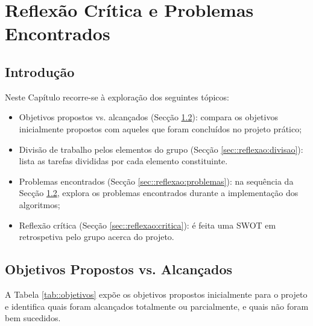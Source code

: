 \chapter{Reflexão Crítica e Problemas Encontrados}
\label{ch::reflexao}

\section{Introdução}
\label{sec::reflexao:intro}

Neste Capítulo recorre-se à exploração dos seguintes tópicos:

\begin{itemize}
	\item Objetivos propostos vs. alcançados (Secção \ref{sec::reflexao:objetivos}): compara os objetivos inicialmente propostos com aqueles que foram concluídos no projeto prático;
	\item Divisão de trabalho pelos elementos do grupo (Secção \ref{sec::reflexao:divisao}): lista as tarefas divididas por cada elemento constituinte.
	\item Problemas encontrados (Secção \ref{sec::reflexao:problemas}): na sequência da Secção \ref{sec::reflexao:objetivos}, explora os problemas encontrados durante a implementação dos algoritmos;
	\item Reflexão crítica (Secção \ref{sec::reflexao:critica}): é feita uma \ac{SWOT} em retrospetiva pelo grupo acerca do projeto.
\end{itemize}

\section{Objetivos Propostos vs. Alcançados}
\label{sec::reflexao:objetivos}

A Tabela \ref{tab::objetivos} expõe os objetivos propostos inicialmente para o projeto e identifica quais foram alcançados totalmente ou parcialmente, e quais não foram bem sucedidos.

